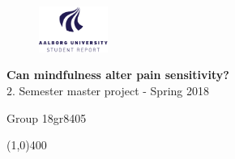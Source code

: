 \clearpage
\thispagestyle{empty}

\begin{figure}[H]
	\raggedleft
	\includegraphics[width=0.2\textwidth]{setup/aau_logo_en.pdf}
\end{figure} 

\vspace{5 cm}

\begin{center}	
	\begin{Huge}
		\textbf{Can mindfulness alter pain sensitivity?}\\
		\vspace{5 mm}
		$2.$ Semester master project - Spring 2018\\
		\vspace{3 mm}
	\end{Huge}
	{\Large Group 18gr8405}
\end{center}
\vspace*{\fill}

\begin{center}
	\line(1,0){400}
\end{center}




